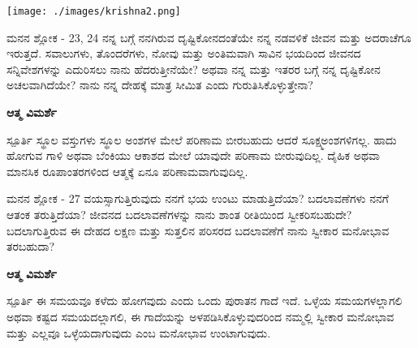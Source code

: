 \thispagestyle{empty}
\begin{center}
\texttt{[image: ./images/krishna2.png]}
\end{center}
\restoregeometry %
\newpage

\begin{mananam}{\mananamfont ಮನನ ಶ್ಲೋಕ - \textenglish{23, 24}}
\footnotesize \mananamtext ನನ್ನ ಬಗ್ಗೆ ನನಗಿರುವ ದೃಷ್ಟಿಕೋನದಂತೆಯೇ ನನ್ನ ನಡವಳಿಕೆ ಜೀವನ ಮತ್ತು ಅದರಾಚೆಗೂ ಇರುತ್ತದೆ. ಸವಾಲುಗಳು, ತೊಂದರೆಗಳು, ನೋವು ಮತ್ತು ಅಂತಿಮವಾಗಿ ಸಾವಿನ ಭಯದಿಂದ ಜೀವನದ ಸನ್ನಿವೇಶಗಳನ್ನು ಎದುರಿಸಲು ನಾನು ಹೆದರುತ್ತೀನೆಯೇ? ಅಥವಾ ನನ್ನ ಮತ್ತು ಇತರರ ಬಗ್ಗೆ ನನ್ನ ದೃಷ್ಟಿಕೋನ ಅಚಲವಾಗಿದೆಯೇ? ನಾನು ನನ್ನ ದೇಹಕ್ಕೆ ಮಾತ್ರ ಸೀಮಿತ ಎಂದು ಗುರುತಿಸಿಕೊಳ್ಳುತ್ತೇನಾ?
\end{mananam}
\WritingHand\enspace\textbf{ಆತ್ಮ ವಿಮರ್ಶೆ}
\begin{inspiration}{\mananamfont ಸ್ಪೂರ್ತಿ}
\footnotesize \mananamtext ಸ್ಥೂಲ ವಸ್ತುಗಳು ಸ್ಥೂಲ ಅಂಶಗಳ ಮೇಲೆ ಪರಿಣಾಮ ಬೀರಬಹುದು ಆದರೆ ಸೂಕ್ಷ್ಮಅಂಶಗಳಿಗಲ್ಲ. ಹಾದು ಹೋಗುವ ಗಾಳಿ ಅಥವಾ ಬೆಂಕಿಯು ಆಕಾಶದ ಮೇಲೆ ಯಾವುದೇ ಪರಿಣಾಮ ಬೀರುವುದಿಲ್ಲ. ದೈಹಿಕ ಅಥವಾ ಮಾನಸಿಕ ರೂಪಾಂತರಗಳಿಂದ ಆತ್ಮಕ್ಕೆ ಏನೂ ಪರಿಣಾಮವಾಗುವುದಿಲ್ಲ.
\end{inspiration}
\newpage

\begin{mananam}{\mananamfont ಮನನ ಶ್ಲೋಕ - \textenglish{27}}
\footnotesize \mananamtext ವಯಸ್ಸಾಗುತ್ತಿರುವುದು ನನಗೆ ಭಯ ಉಂಟು ಮಾಡುತ್ತಿದೆಯಾ? ಬದಲಾವಣೆಗಳು ನನಗೆ ಆತಂಕ ತರುತ್ತಿದೆಯಾ? ಜೀವನದ ಬದಲಾವಣೆಗಳನ್ನು ನಾನು ಶಾಂತ ರೀತಿಯಿಂದ ಸ್ವೀಕರಿಸಬಹುದೇ? ಬದಲಾಗುತ್ತಿರುವ ಈ ದೇಹದ ಲಕ್ಷಣ ಮತ್ತು ಸುತ್ತಲಿನ ಪರಿಸರದ ಬದಲಾವಣೆಗೆ ನಾನು ಸ್ವೀಕಾರ ಮನೋಭಾವ ತರಬಹುದಾ? 
\end{mananam}
\WritingHand\enspace\textbf{ಆತ್ಮ ವಿಮರ್ಶೆ}
\begin{inspiration}{\mananamfont ಸ್ಪೂರ್ತಿ}
\footnotesize \mananamtext ಈ ಸಮಯವೂ ಕಳೆದು ಹೋಗವುದು ಎಂದು ಒಂದು ಪುರಾತನ ಗಾದೆ ಇದೆ. ಒಳ್ಳೆಯ ಸಮಯಗಳಲ್ಲಾಗಲಿ ಅಥವಾ ಕಷ್ಟದ ಸಮಯದಲ್ಲಾಗಲಿ, ಈ ಗಾದೆಯನ್ನು ಅಳಪಡಿಸಿಕೊಳ್ಳುವುದರಿಂದ ನಮ್ಮಲ್ಲಿ ಸ್ವೀಕಾರ ಮನೋಭಾವ ಮತ್ತು ಎಲ್ಲವೂ ಒಳ್ಳೆಯದಾಗುವುದು ಎಂಬ ಮನೋಭಾವ ಉಂಟಾಗುವುದು.
\end{inspiration}
\newpage

